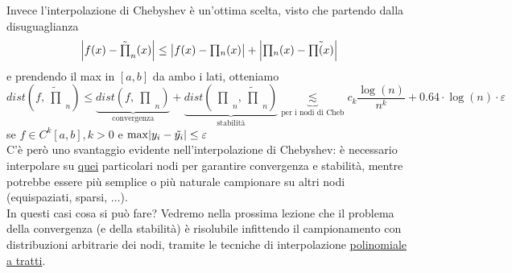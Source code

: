 \documentclass[12pt]{article}
\DeclarePairedDelimiter{\abs}{\lvert}{\rvert}
\newcommand{\inter}{\begin{matrix}\prod\end{matrix}}
\begin{document}
Invece l'interpolazione di Chebyshev è un'ottima scelta, visto che partendo dalla disuguaglianza
\[ \abs*{f(x) - \tilde{\inter}_n (x)} \leq \abs*{f(x) - \inter_n (x)} + \abs*{\inter_n (x) - \tilde{\inter (x)}} \]
e prendendo il max in $[a,b]$ da ambo i lati, otteniamo
\[ dist\left(f, \tilde{\inter}_n\right) \leq \underbrace{dist \left(f, \inter_n \right)}_{\text{convergenza}} + \underbrace{dist \left( \inter_n, \tilde{\inter}_n\right)}_{\text{stabilità}} \underbrace{\lesssim}_{\text{per i nodi di Cheb}} c_k \frac{\log(n)}{n^k} + 0.64\cdot \log(n) \cdot \varepsilon \]
se $f \in C^k [a,b], k>0$ e $\max\abs{y_i - \tilde{y_i}} \leq \varepsilon$\\
C'è però uno svantaggio evidente nell'interpolazione di Chebyshev: è necessario interpolare su \uline{quei} particolari nodi per garantire convergenza e stabilità, mentre potrebbe essere più semplice o più naturale campionare su altri nodi (equispaziati, sparsi, $\dotso$).\\
In questi casi cosa si può fare? Vedremo nella prossima lezione che il problema della convergenza (e della stabilità) è risolubile infittendo il campionamento con distribuzioni arbitrarie dei nodi, tramite le tecniche di interpolazione \uline{polinomiale a tratti}.
\end{document}
